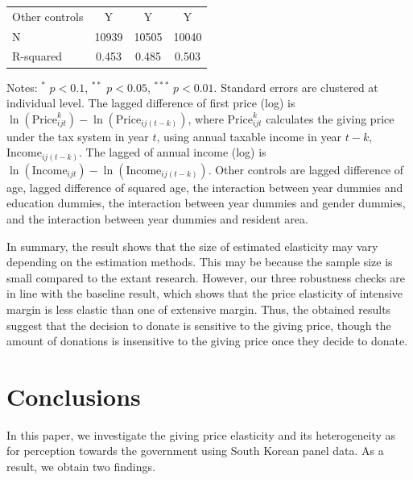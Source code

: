 \documentclass[ review  , 3p ]{elsarticle}
\begin{document}
\begin{table}
\begin{threeparttable}
\begin{tabular}[t]{lccc}
  \hspace{1em}Other controls & Y & Y & Y\\
  \hspace{1em}N & 10939 & 10505 & 10040\\
  \hspace{1em}R-squared & 0.453 & 0.485 & 0.503\\
  \bottomrule
  \end{tabular}
  \begin{tablenotes}
  \item Notes: $^{*}$ $p < 0.1$, $^{**}$ $p < 0.05$, $^{***}$ $p < 0.01$. Standard errors are clustered at individual level. The lagged difference of first price (log) is $\ln(\text{Price}^k_{ijt}) - \ln(\text{Price}_{ij(t-k)})$, where $\text{Price}^k_{ijt}$ calculates the giving price under the tax system in year $t$, using annual taxable income in year $t-k$, $\text{Income}_{ij(t-k)}$. The lagged of annual income (log) is $\ln(\text{Income}_{ijt}) - \ln(\text{Income}_{ij(t-k)})$. Other controls are lagged difference of age, lagged difference of squared age, the interaction between year dummies and education dummies, the interaction between year dummies and gender dummies, and the interaction between year dummies and resident area.
  \end{tablenotes}
  \end{threeparttable}
  \end{table}

  In summary, the result shows that the size of estimated elasticity may vary depending on the estimation methods. This may be because the sample size is small compared to the extant research. However, our three robustness checks are in line with the baseline result, which shows that the price elasticity of intensive margin is less elastic than one of extensive margin. Thus, the obtained results suggest that the decision to donate is sensitive to the giving price, though the amount of donations is insensitive to the giving price once they decide to donate.

  \hypertarget{conclusions}{%
  \section{Conclusions}\label{conclusions}}

  In this paper, we investigate the giving price elasticity and its heterogeneity as for perception towards the government using South Korean panel data. As a result, we obtain two findings.
\end{document}
